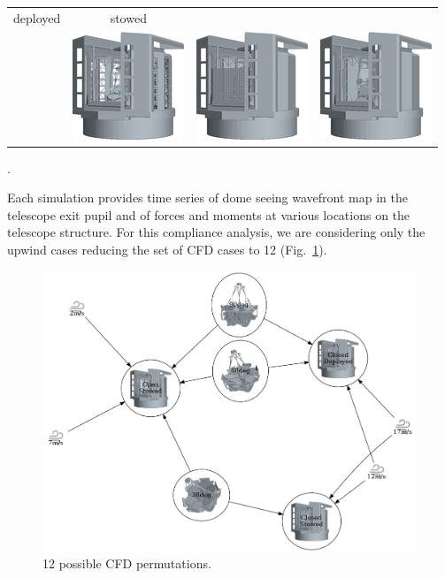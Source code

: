 \documentclass[]{AO4ELT}  %
\begin{document}
\begin{itemize}
\begin{tabular}{cccc}
            deployed                                                      &
            stowed                                                                                                                         \\
                                                                          & \includegraphics[width=0.2\linewidth]{zen30az000_OS7_tr.png} &
            \includegraphics[width=0.2\linewidth]{zen30az000_CD12_tr.png} &
            \includegraphics[width=0.2\linewidth]{zen60az000_CS17_tr.png}
         \end{tabular}.
\end{itemize}
Each simulation provides time series of dome seeing wavefront map in the telescope exit pupil and of forces and moments at various locations on the telescope structure.
For this compliance analysis, we are considering only the upwind cases reducing the set of CFD cases to 12 (Fig.~\ref{fig:17}).
\begin{figure}
   \centering
   \includegraphics[width=\linewidth]{cfd_cases_tr.dot.png}
   \caption{12 possible CFD permutations.}
   \label{fig:17}
\end{figure}
\end{document}
